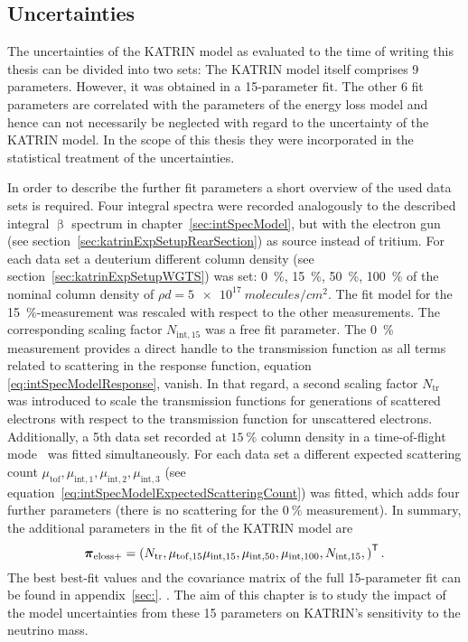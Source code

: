 \subsection{Uncertainties}
The uncertainties of the KATRIN model as evaluated to the time of writing this thesis can be divided into two sets: The KATRIN model itself comprises 9 parameters. However, it was obtained in a 15-parameter fit. The other 6 fit parameters are correlated with the parameters of the energy loss model and hence can not necessarily be neglected with regard to the uncertainty of the KATRIN model. In the scope of this thesis they were incorporated in the statistical treatment of the uncertainties. 

In order to describe the further fit parameters a short overview of the used data sets is required. Four integral spectra were recorded analogously to the described integral $\upbeta$ spectrum in chapter~\ref{sec:intSpecModel}, but with the electron gun (see section~\ref{sec:katrinExpSetupRearSection}) as source instead of tritium. For each data set a deuterium different column density (see section~\ref{sec:katrinExpSetupWGTS}) was set: \SI{0}{\percent}, \SI{15}{\percent}, \SI{50}{\percent}, \SI{100}{\percent} of the nominal column density of $\rho d = \SI{5e17}{molecules/cm^2}$. The fit model for the \SI{15}{\percent}-measurement was rescaled with respect to the other measurements\footnotemark[3]. The corresponding scaling factor $N_{\mathrm{int},15}$ was a free fit parameter. The \SI{0}{\percent} measurement provides a direct handle to the transmission function as all terms related to scattering in the response function, equation \eqref{eq:intSpecModelResponse}, vanish. In that regard, a second scaling factor $N_\mathrm{tr}$ was introduced to scale the transmission functions for generations of scattered electrons with respect to the transmission function for unscattered electrons. Additionally, a 5th data set recorded at $\SI{15}{\percent}$ column density in a time-of-flight mode~\cite{Bonn1999} was fitted simultaneously. For each data set a different expected scattering count $\mu_\mathrm{tof}, \mu_{\mathrm{int},1}, \mu_{\mathrm{int},2}, \mu_{\mathrm{int},3}$ (see equation~\eqref{eq:intSpecModelExpectedScatteringCount}) was fitted, which adds four further parameters (there is no scattering for the $\SI{0}{\percent}$ measurement). In summary, the additional parameters in the fit of the KATRIN model are
\begin{equation}
	\boldsymbol{\mathbf{\pi}}_\mathrm{eloss+} = 
	{\left(
		N_\mathrm{tr},
		\mu_{\mathrm{tof},15}
		\mu_{\mathrm{int},15}, 
		\mu_{\mathrm{int},50}, 
		\mu_{\mathrm{int},100},
		N_{\mathrm{int},15},
		\right)}^{\mathsf{T}}
	\text{\,.}
\end{equation}
The best best-fit values and the covariance matrix of the full 15-parameter fit can be found in appendix~\ref{sec:}. . The aim of this chapter is to study the impact of the model uncertainties from these 15 parameters on KATRIN's sensitivity to the neutrino mass.

